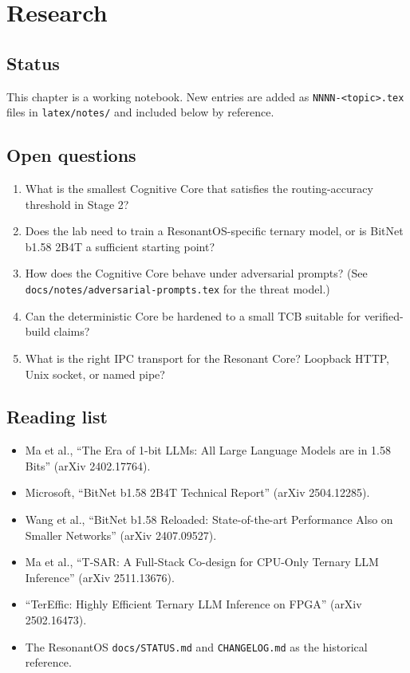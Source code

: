 
\chapter{Research}

\section{Status}

This chapter is a working notebook. New entries are added as
\texttt{NNNN-<topic>.tex} files in \texttt{latex/notes/} and included
below by reference.

\section{Open questions}

\begin{enumerate}
  \item What is the smallest Cognitive Core that satisfies the
        routing-accuracy threshold in Stage 2?
  \item Does the lab need to train a ResonantOS-specific ternary
        model, or is BitNet b1.58 2B4T a sufficient starting point?
  \item How does the Cognitive Core behave under adversarial
        prompts? (See \texttt{docs/notes/adversarial-prompts.tex}
        for the threat model.)
  \item Can the deterministic Core be hardened to a small TCB
        suitable for verified-build claims?
  \item What is the right IPC transport for the Resonant Core?
        Loopback HTTP, Unix socket, or named pipe?
\end{enumerate}

\section{Reading list}

\begin{itemize}
  \item Ma et al., ``The Era of 1-bit LLMs: All Large Language
        Models are in 1.58 Bits'' (arXiv 2402.17764).
  \item Microsoft, ``BitNet b1.58 2B4T Technical Report''
        (arXiv 2504.12285).
  \item Wang et al., ``BitNet b1.58 Reloaded: State-of-the-art
        Performance Also on Smaller Networks'' (arXiv 2407.09527).
  \item Ma et al., ``T-SAR: A Full-Stack Co-design for CPU-Only
        Ternary LLM Inference'' (arXiv 2511.13676).
  \item ``TerEffic: Highly Efficient Ternary LLM Inference on
        FPGA'' (arXiv 2502.16473).
  \item The ResonantOS \texttt{docs/STATUS.md} and
        \texttt{CHANGELOG.md} as the historical reference.
\end{itemize}

